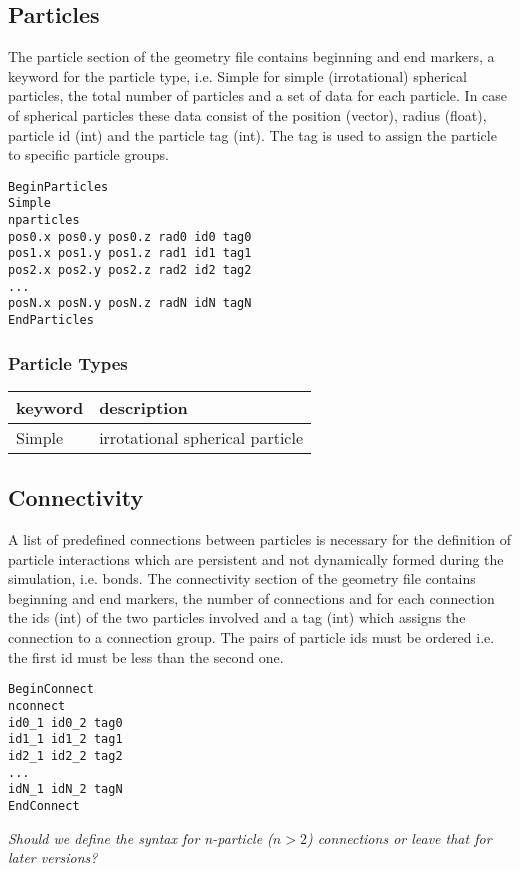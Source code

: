 \documentclass{article}
\begin{document}
\subsection{Particles}

The particle section of the geometry file contains beginning and end markers, a keyword for the particle type, i.e. \textsf{Simple} for simple (irrotational) spherical particles, the total number of particles and a set of data for each particle. In case of spherical particles these data consist of the position (vector), radius (float), particle id (int)  and the particle tag (int). The tag is used to assign the particle to specific particle groups. 
\begin{verbatim}
BeginParticles
Simple
nparticles
pos0.x pos0.y pos0.z rad0 id0 tag0
pos1.x pos1.y pos1.z rad1 id1 tag1 
pos2.x pos2.y pos2.z rad2 id2 tag2 
...
posN.x posN.y posN.z radN idN tagN 
EndParticles
\end{verbatim}
\subsubsection{Particle Types}
\begin{tabular}[h!]{|l|l|}
\hline
keyword & description \\
\hline
\hline
Simple & irrotational spherical particle \\
\hline
\end{tabular}


\subsection{Connectivity}

A list of predefined connections between particles is necessary for the definition of particle interactions which are persistent and not dynamically formed during the simulation, i.e. bonds. The connectivity section of the geometry file contains beginning and end markers, the number of connections and for each connection the ids (int) of the two particles involved and a tag (int) which assigns the connection to a connection group. The pairs of particle ids must be ordered i.e. the first id must be less than the second one.
\begin{verbatim}
BeginConnect
nconnect
id0_1 id0_2 tag0
id1_1 id1_2 tag1
id2_1 id2_2 tag2
...
idN_1 idN_2 tagN
EndConnect
\end{verbatim}
\textit{Should we define the syntax for n-particle ($n>2$) connections or leave that for later versions?}
\label{sec:prp}
\end{document}
